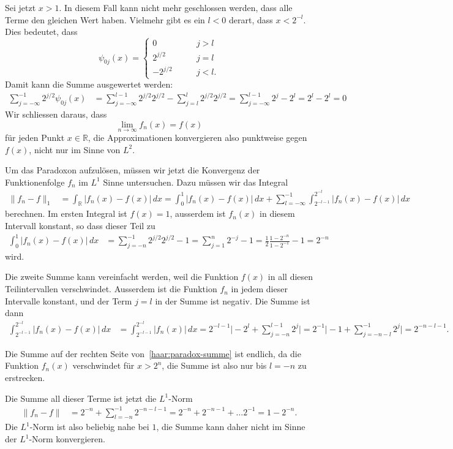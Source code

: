 Sei jetzt $x>1$.
In diesem Fall kann nicht mehr geschlossen werden, dass alle Terme den
gleichen Wert haben.
Vielmehr gibt es ein $l<0$ derart, dass $x < 2^{-l}$.
Dies bedeutet, dass
\[
\psi_{0j}(x)
=
\begin{cases}
0&\qquad j>l\\
2^{j/2}&\qquad j = l
\\
-2^{j/2}&\qquad j < l.
\end{cases}
\]
Damit kann die Summe ausgewertet werden:
\begin{align*}
\sum_{j=-\infty}^{-1} 2^{j/2} \psi_{0j}(x)
&=
\sum_{j=-\infty}^{l-1} 2^{j/2} 2^{j/2}
-
\sum_{j=l}^{l} 2^{j/2} 2^{j/2}
=
\sum_{j=-\infty}^{l-1} 2^j
-
2^l
=
2^l
-
2^l
=
0
\end{align*}
Wir schliessen daraus, dass 
\[
\lim_{n\to\infty} f_n(x) = f(x)
\]
für jeden Punkt $x\in\mathbb R$, die Approximationen konvergieren also
punktweise gegen $f(x)$, nicht nur im Sinne von $L^2$.

Um das Paradoxon aufzulösen, müssen wir jetzt die Konvergenz der
Funktionenfolge $f_n$ im $L^1$ Sinne untersuchen.
Dazu müssen wir das Integral
\begin{align}
\| f_n-f\|_1
&=
\int_{\mathbb R} |f_n(x) - f(x)| \,dx
=
\int_0^1 |f_n(x) - f(x)|\,dx
+
\sum_{l=-\infty}^{-1}
\int_{2^{-l-1}}^{2^{-l}} |f_n(x)-f(x)|\,dx
\label{haar:paradox-summe}
\end{align}
berechnen.
Im ersten Integral ist $f(x)=1$, ausserdem ist $f_n(x)$ in diesem Intervall
konstant, so dass dieser Teil zu
\begin{align*}
\int_0^1 |f_n(x) - f(x)|\,dx
&=
\sum_{j=-n}^{-1} 2^{j/2} 2^{j/2} - 1
=
\sum_{j=1}^{n} 2^{-j} - 1
=
\frac12
\frac{1-2^{-n}}{1-2^{-1}}-1
=
2^{-n}
\end{align*}
wird.

Die zweite Summe kann vereinfacht werden, weil die Funktion $f(x)$ in all
diesen Teilintervallen verschwindet.
Ausserdem ist die Funktion $f_n$ in jedem dieser Intervalle konstant,
und der Term $j=l$ in der Summe ist negativ.
Die Summe ist dann
\begin{align*}
\int_{2^{-l-1}}^{2^{-l}} |f_n(x)-f(x)|\,dx
&=
\int_{2^{-l-1}}^{2^{-l}} |f_n(x)|\,dx
=
2^{-l-1} 
\biggl|
-2^{l}
+
\sum_{j=-n}^{l-1}  2^{j}
\biggr|
=
2^{-1} 
\biggl|
-1
+
\sum_{j=-n-l}^{-1}  2^{j}
\biggr|
=
2^{-n-l-1}.
\end{align*}

Die Summe auf der rechten Seite von~\eqref{haar:paradox-summe} ist
endlich, da die Funktion $f_n(x)$ verschwindet für $x>2^n$, die Summe
ist also nur bis $l=-n$ zu erstrecken.

Die Summe all dieser Terme ist jetzt die $L^1$-Norm
\begin{align*}
\|f_n - f\|
&=
2^{-n} + \sum_{l=-n}^{-1} 2^{-n-l-1}
=
2^{-n} + 2^{-n-1} + \dots 2^{-1}
=
1- 2^{-n}.
\end{align*}
Die $L^1$-Norm ist also beliebig nahe bei $1$, die Summe kann daher
nicht im Sinne der $L^1$-Norm konvergieren.

